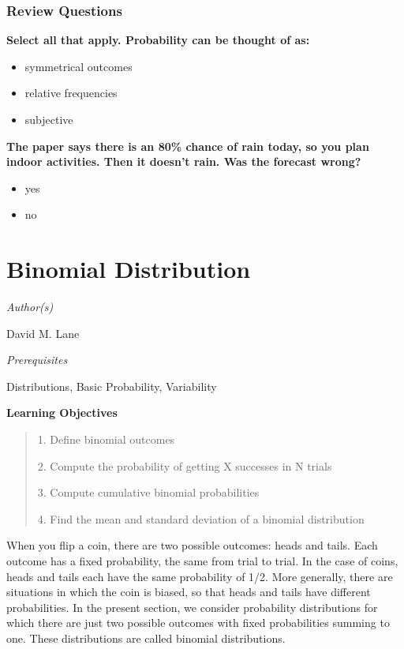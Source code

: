 \documentclass{book}
\begin{document}
\hypertarget{review-questions}{%
\subsection{Review Questions}\label{review-questions}}

\textbf{Select all that apply. Probability can be thought of as:}

\begin{itemize}
\item
  symmetrical outcomes
\item
  relative frequencies
\item
  subjective
\end{itemize}

\textbf{The paper says there is an 80\% chance of rain today, so you plan
indoor activities. Then it doesn't rain. Was the forecast wrong?}

\begin{itemize}
\item
  yes
\item
  no
\end{itemize}

\hypertarget{binomial-distribution}{%
\chapter{Binomial Distribution}\label{binomial-distribution}}

\emph{Author(s)}

David M. Lane

\emph{Prerequisites}

Distributions, Basic Probability, Variability

\textbf{Learning Objectives}

\begin{quote}
1. Define binomial outcomes

2. Compute the probability of getting X successes in N trials

3. Compute cumulative binomial probabilities

4. Find the mean and standard deviation of a binomial distribution
\end{quote}

When you flip a coin, there are two possible outcomes: heads and tails. Each
outcome has a fixed probability, the same from trial to trial. In the case of
coins, heads and tails each have the same probability of 1/2. More generally,
there are situations in which the coin is biased, so that heads and tails have
different probabilities. In the present section, we consider probability
distributions for which there are just two possible outcomes with fixed
probabilities summing to one. These distributions are called binomial
distributions.
\end{document}

